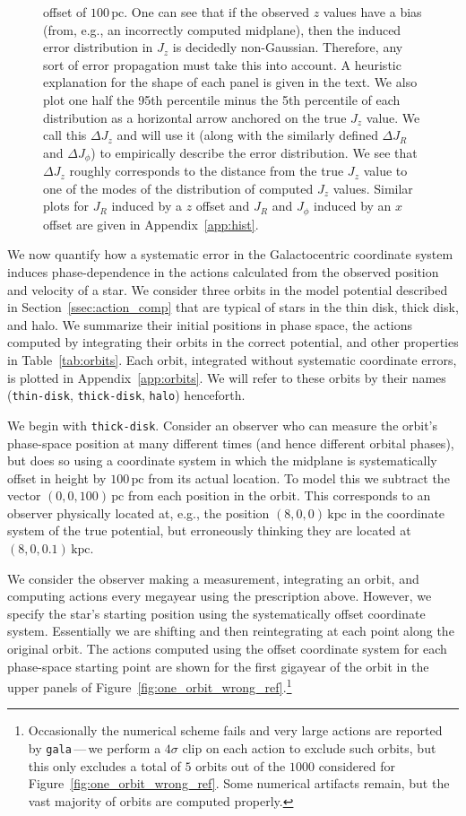 \documentclass[twocolumn]{aastex62}
\newcommand{\pc}{\text{pc}}
\newcommand{\kpc}{\text{kpc}}
\newcommand{\thin}{\texttt{thin-disk}}
\newcommand{\thick}{\texttt{thick-disk}}
\newcommand{\halo}{\texttt{halo}}
\begin{document}
\begin{figure}
{offset of $100\,\pc$. One can see that if the observed $z$ values have a bias
(from, e.g., an incorrectly computed midplane), then the induced error
distribution in $J_z$ is decidedly non-Gaussian. Therefore, any sort of error
propagation must take this into account. A heuristic explanation for the shape
of each panel is given in the text. We also plot one half the 95th percentile
minus the 5th percentile of each distribution as a horizontal arrow anchored
on the true $J_z$ value. We call this $\Delta J_z$ and will use it (along with
the similarly defined $\Delta J_R$ and $\Delta J_{\phi}$) to empirically
describe the error distribution. We see that $\Delta J_z$ roughly corresponds
to the distance from the true $J_z$ value to one of the modes of the
distribution of computed $J_z$ values. Similar plots for $J_R$ induced by a
$z$ offset and $J_R$ and $J_{\phi}$ induced by an $x$ offset are given in
Appendix~\ref{app:hist}.}
\label{fig:Jz_hist}
\end{figure}

We now quantify how a systematic error in the Galactocentric coordinate system
induces phase-dependence in the actions calculated from the observed position
and velocity of a star. We consider three orbits in the model potential
described in Section~\ref{ssec:action_comp} that are typical of stars in the
thin disk, thick disk, and halo. We summarize their initial positions in phase
space, the actions computed by integrating their orbits in the correct
potential, and other properties in Table~\ref{tab:orbits}. Each orbit,
integrated without systematic coordinate errors, is plotted in
Appendix~\ref{app:orbits}. We will refer to these orbits by their names
(\thin{}, \thick{}, \halo{}) henceforth.

We begin with \thick{}. Consider an observer who can measure the orbit's
phase-space position at many different times (and hence different orbital
phases), but does so using a coordinate system in which the midplane is
systematically offset in height by $100\,\pc$ from its actual location. To
model this we subtract the vector $(0, 0, 100)\,\pc$ from each position in the
orbit. This corresponds to an observer physically located at, e.g., the
position $(8, 0, 0)\,\kpc$ in the coordinate system of the true potential, but
erroneously thinking they are located at $(8, 0, 0.1)\,\kpc$.

We consider the observer making a measurement, integrating an orbit, and
computing actions every megayear using the prescription above. However, we
specify the star's starting position using the systematically offset
coordinate system. Essentially we are shifting and then reintegrating at each
point along the original orbit. The actions computed using the offset
coordinate system for each phase-space starting point are shown for the first
gigayear of the orbit in the upper panels of
Figure~\ref{fig:one_orbit_wrong_ref}.\footnote{Occasionally the numerical
scheme fails and very large actions are reported by \texttt{gala}\,---\,we
perform a $4\sigma$ clip on each action to exclude such orbits, but this only
excludes a total of $5$ orbits out of the $1000$ considered for
Figure~\ref{fig:one_orbit_wrong_ref}. Some numerical artifacts remain, but the
vast majority of orbits are computed properly.}
\end{document}

